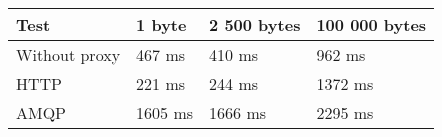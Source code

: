 \begin{tabularx}{\textwidth}{llll}
\hline
 Test          & 1 byte   & 2 500 bytes   & 100 000 bytes   \\
\hline
 Without proxy & 467 ms   & 410 ms        & 962 ms          \\
 HTTP          & 221 ms   & 244 ms        & 1372 ms         \\
 AMQP          & 1605 ms  & 1666 ms       & 2295 ms         \\
\hline
\end{tabularx}